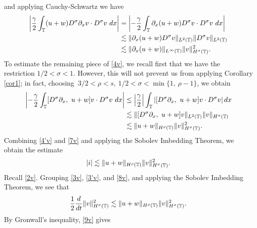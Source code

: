 	and applying Cauchy-Schwartz we have
	\begin{equation}
		\begin{split}
			\left | \frac{\gamma}{2}\int_{\mathbb{T}} (u+w) D^\sigma \partial_x v \cdot
			D^\sigma v \ dx \right |
			& = \left | -\frac{\gamma}{2} \int_{\mathbb{T}} \partial_x (u+w) D^\sigma v
			\cdot D^\sigma v \ dx \right |
			\\
			& \lesssim \|\partial_x (u+w) D^\sigma v \|_{L^2(\mathbb{T})} \|D^\sigma
			v\|_{L^2(\mathbb{T})}
			\\
			& \lesssim \|\partial_x (u+w)\|_{L^\infty(\mathbb{T})}
			\|v\|_{H^\sigma(\mathbb{T})}^2.
			\label{4'v}
		\end{split}
	\end{equation}
	To estimate the remaining piece of \eqref{4v}, we recall first that we
	have the restriction $1/2 < \sigma < 1$. However, this will not prevent
	us from applying Corollary \ref{cor1}; in fact, choosing $\ 3/2 < \rho
	< s,  \ 1/2< \sigma <\min\{1, \ \rho -1 \}$, we obtain
	\begin{equation}
		\begin{split}
			\left | -\frac{\gamma}{2} \int_{\mathbb{T}} [D^\sigma \partial_x, \ u+w] v
			\cdot D^\sigma v \ dx \right |
			& \le \left | \frac{\gamma}{2} \right| \int_{\mathbb{T}} \left |
			[D^\sigma \partial_x, \ u+w] v
			\cdot D^\sigma v \right | dx 
			\\
			& \lesssim \|[D^\sigma \partial_x, \ u+w]v\|_{L^2(\mathbb{T})}
			\|v\|_{H^\sigma(\mathbb{T})} \\
			& \lesssim \|u+w\|_{H^\rho(\mathbb{T})} \|v\|_{H^\sigma(\mathbb{T})}^2.
			\label{7v}
		\end{split}
	\end{equation}
	Combining \eqref{4'v} and \eqref{7v} and applying the Sobolev Imbedding
	Theorem, we obtain the estimate
	\begin{equation}
		\begin{split}
			|i| \lesssim \|u+w\|_{H^\rho(\mathbb{T})} \|v\|_{H^\sigma(\mathbb{T})}^2.
			\label{8v}
		\end{split}
	\end{equation}
	Recall \eqref{2v}. Grouping \eqref{3v}, \eqref{3'v}, and \eqref{8v}, and applying
	the Sobolev Imbedding Theorem, we see that 
	\begin{equation}
		\begin{split}
			\frac{1}{2} \frac{d}{dt}
			\|v\|_{H^\sigma(\mathbb{T})}^2 \lesssim \|u+w\|_{H^\rho(\mathbb{T})}
			\|v\|_{H^\sigma(\mathbb{T})}^2.
			\label{9v}
		\end{split}
	\end{equation}
	By Gronwall's inequality, \eqref{9v} gives
